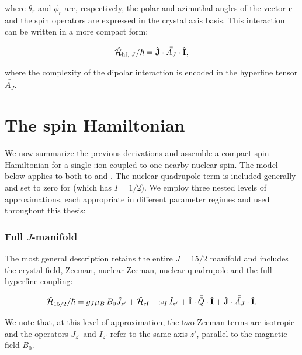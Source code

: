 \noindent where $\theta_r$ and $\phi_r$ are, respectively, the polar and azimuthal angles of the vector $\mathbf{r}$ and the spin operators are expressed in the crystal axis basis. This interaction can be written in a more compact form:

\begin{equation}
    \hat{\mathcal{H}}_{\text{hf, $J$}} / \hbar = \hat{\mathbf{J}} \cdot \bar{\bar {A_J}} \cdot \hat{\mathbf{I}},
    \label{eq:hf_J_hamiltonian}
\end{equation}

\noindent where the complexity of the dipolar interaction is encoded in the hyperfine tensor $\bar{\bar{A_J}}$. 

\section{The spin Hamiltonian}

We now summarize the previous derivations and assemble a compact spin Hamiltonian for a single \Er:\Ca ion coupled to one nearby nuclear spin. The model below applies to both to \W and \Nb. The nuclear quadrupole term is included generally and set to zero for \W (which has $I=1/2$). We employ three nested levels of approximations, each appropriate in different parameter regimes and used throughout this thesis:

\subsubsection{Full $J$-manifold} 

The most general description retains the entire $J=15/2$ manifold and includes the crystal-field, Zeeman, nuclear Zeeman, nuclear quadrupole and the full hyperfine coupling:
    
\begin{equation}
    \hat{\mathcal{H}}_{\text{15/2}} / \hbar = g_J \mu_B \, B_0 \hat{J}_{z'} + \hat{\mathcal{H}}_{\text{cf}} + \omega_I \, \hat{I}_{z'} + \hat{\mathbf{I}} \cdot \bar{\bar{Q}} \cdot \hat{\mathbf{I}} + \hat{\mathbf{J}} \cdot \bar{\bar {A_J}} \cdot \hat{\mathbf{I}}.
    \label{eq:full_spin_hamiltonian}
\end{equation}

We note that, at this level of approximation, the two Zeeman terms are isotropic and the operators $J_{z'}$ and $I_{z'}$ refer to the same axis $z'$, parallel to the magnetic field $B_0$.

